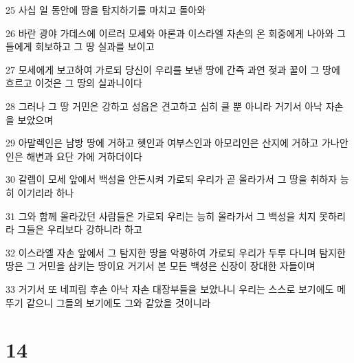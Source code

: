 \par 25 사십 일 동안에 땅을 탐지하기를 마치고 돌아와
\par 26 바란 광야 가데스에 이르러 모세와 아론과 이스라엘 자손의 온 회중에게 나아와 그들에게 회보하고 그 땅 실과를 보이고
\par 27 모세에게 보고하여 가로되 당신이 우리를 보낸 땅에 간즉 과연 젖과 꿀이 그 땅에 흐르고 이것은 그 땅의 실과니이다
\par 28 그러나 그 땅 거민은 강하고 성읍은 견고하고 심히 클 뿐 아니라 거기서 아낙 자손을 보았으며
\par 29 아말렉인은 남방 땅에 거하고 헷인과 여부스인과 아모리인은 산지에 거하고 가나안인은 해변과 요단 가에 거하더이다
\par 30 갈렙이 모세 앞에서 백성을 안돈시켜 가로되 우리가 곧 올라가서 그 땅을 취하자 능히 이기리라 하나
\par 31 그와 함께 올라갔던 사람들은 가로되 우리는 능히 올라가서 그 백성을 치지 못하리라 그들은 우리보다 강하니라 하고
\par 32 이스라엘 자손 앞에서 그 탐지한 땅을 악평하여 가로되 우리가 두루 다니며 탐지한 땅은 그 거민을 삼키는 땅이요 거기서 본 모든 백성은 신장이 장대한 자들이며
\par 33 거기서 또 네피림 후손 아낙 자손 대장부들을 보았나니 우리는 스스로 보기에도 메뚜기 같으니 그들의 보기에도 그와 같았을 것이니라

\chapter{14}

